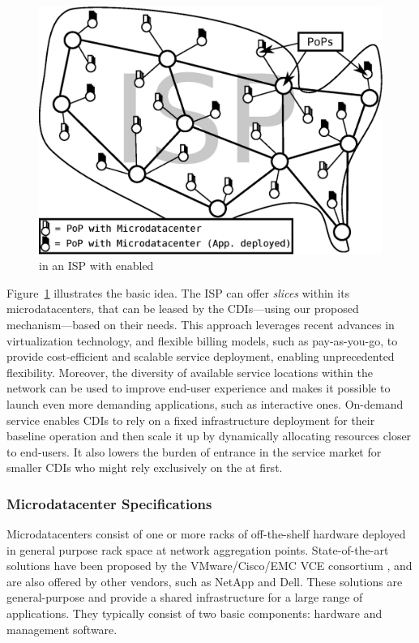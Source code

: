 \begin{figure} \begin{center}
\includegraphics[width=0.9\linewidth]{figures/ISP+Content.eps} \end{center}
\caption{\MDCs in an ISP with \Netpaas enabled} \label{fig:story} \end{figure}

Figure~\ref{fig:story} illustrates the basic idea. The ISP can offer
\emph{slices} within its microdatacenters, that can be leased by the
CDIs---using our proposed mechanism---based on their needs. This approach
leverages recent advances in virtualization technology, and flexible billing
models, such as pay-as-you-go, to provide cost-efficient and scalable service
deployment, enabling unprecedented flexibility.  Moreover, the diversity of
available service locations within the network can be used to improve end-user
experience and makes it possible to launch even more demanding applications,
such as interactive ones. On-demand service enables CDIs to rely on a fixed
infrastructure deployment for their baseline operation and then scale it up by
dynamically allocating resources closer to end-users. It also lowers the burden
of entrance in the service market for smaller CDIs who might rely exclusively
on the \onservice at first.

\subsubsection{Microdatacenter
Specifications}\label{sec:microdatacenters-specification}

Microdatacenters consist of one or more racks of off-the-shelf hardware
deployed in general purpose rack space at network aggregation points.
State-of-the-art solutions have been proposed by the VMware/Cisco/EMC VCE
consortium \cite{VCE}, and are also offered by other vendors, such as NetApp
and Dell.  These solutions are general-purpose and provide a shared
infrastructure for a large range of applications. They typically consist of two
basic components: hardware and management software.


